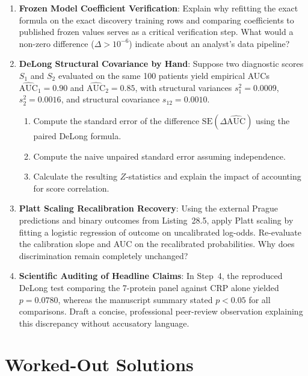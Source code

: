 \documentclass[11pt,twoside,openright]{book}
\begin{document}
\begin{enumerate}
    \item \textbf{Frozen Model Coefficient Verification}: Explain why refitting the exact formula on the exact discovery training rows and comparing coefficients to published frozen values serves as a critical verification step. What would a non-zero difference ($\Delta > 10^{-6}$) indicate about an analyst's data pipeline?
    \item \textbf{DeLong Structural Covariance by Hand}: Suppose two diagnostic scores $S_1$ and $S_2$ evaluated on the same 100 patients yield empirical AUCs $\widehat{\text{AUC}}_1 = 0.90$ and $\widehat{\text{AUC}}_2 = 0.85$, with structural variances $s_1^2 = 0.0009$, $s_2^2 = 0.0016$, and structural covariance $s_{12} = 0.0010$.
    \begin{enumerate}
        \item Compute the standard error of the difference $\text{SE}(\Delta\widehat{\text{AUC}})$ using the paired DeLong formula.
        \item Compute the naive unpaired standard error assuming independence.
        \item Calculate the resulting $Z$-statistics and explain the impact of accounting for score correlation.
    \end{enumerate}
    \item \textbf{Platt Scaling Recalibration Recovery}: Using the external Prague predictions and binary outcomes from Listing~28.5, apply Platt scaling by fitting a logistic regression of outcome on uncalibrated log-odds. Re-evaluate the calibration slope and AUC on the recalibrated probabilities. Why does discrimination remain completely unchanged?
    \item \textbf{Scientific Auditing of Headline Claims}: In Step~4, the reproduced DeLong test comparing the 7-protein panel against CRP alone yielded $p = 0.0780$, whereas the manuscript summary stated $p < 0.05$ for all comparisons. Draft a concise, professional peer-review observation explaining this discrepancy without accusatory language.
\end{enumerate}

\section{Worked-Out Solutions}
\end{document}
